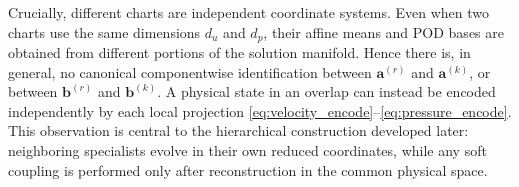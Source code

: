 Crucially, different charts are independent coordinate systems.  Even when
two charts use the same dimensions $d_u$ and $d_p$, their affine means and POD
bases are obtained from different portions of the solution manifold.  Hence
there is, in general, no canonical componentwise identification between
$\boldsymbol{a}^{(r)}$ and $\boldsymbol{a}^{(k)}$, or between
$\boldsymbol{b}^{(r)}$ and $\boldsymbol{b}^{(k)}$.  A physical state in an
overlap can instead be encoded independently by each local projection
\eqref{eq:velocity_encode}--\eqref{eq:pressure_encode}.  This observation is
central to the hierarchical construction developed later: neighboring
specialists evolve in their own reduced coordinates, while any soft coupling
is performed only after reconstruction in the common physical space.
